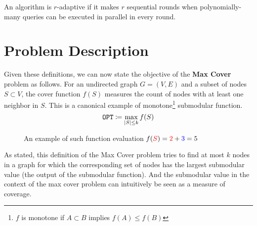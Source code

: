 \documentclass[11pt, a4paper]{article}
\begin{document}

\begin{definition}[Adaptivity]
An algorithm is $r$-adaptive if it makes $r$ sequential rounds when polynomially-many queries can be executed in parallel in every round.
\end{definition}

\section{Problem Description} %
Given these definitions, we can now state the objective of the \textbf{Max Cover} problem as follows. For an undirected graph $G = (V, E)$ and a subset of nodes $S \subset V$, the cover function $f(S)$ measures the count of nodes with at least one neighbor in $S$. This is a canonical example of monotone\footnote{$f$ is monotone if $A \subset B$ implies $f(A) \leq f(B)$} submodular function.
\begin{equation}
    {\tt O P T} \coloneqq \max _{|S| \leq k} f(S)
\end{equation}

\begin{figure}[H]
\centering

\caption{An example of such function evaluation $f(\textcolor{red}{S}) = \textcolor{red}{2} + \textcolor{blue}{3} = 5$}
\label{fig:max-cover}
\end{figure}

As stated, this definition of the Max Cover problem tries to find at most $k$ nodes in a graph for which the corresponding set of nodes has the largest submodular value (the output of the submodular function). And the submodular value in the context of the max cover problem can intuitively be seen as a measure of coverage.
 
\end{document}
